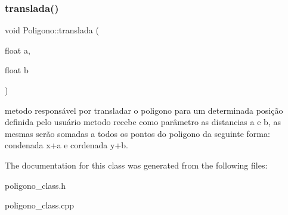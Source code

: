 \subsubsection{\texorpdfstring{translada()}{translada()}}
{\footnotesize\ttfamily void Poligono\+::translada (\begin{DoxyParamCaption}\item[{float}]{a,  }\item[{float}]{b }\end{DoxyParamCaption})}

metodo responsável por transladar o poligono para um determinada posição definida pelo usuário metodo recebe como parâmetro as distancias a e b, as mesmas serão somadas a todos os pontos do poligono da seguinte forma\+: condenada x+a e cordenada y+b. 

The documentation for this class was generated from the following files\+:\begin{DoxyCompactItemize}
\item 
poligono\+\_\+class.\+h\item 
poligono\+\_\+class.\+cpp\end{DoxyCompactItemize}
